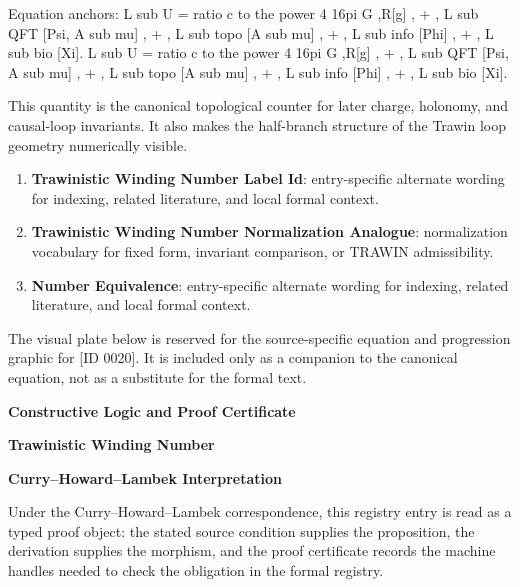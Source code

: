 Equation anchors: L sub U = ratio c to the power 4 16pi G ,R[g] , + , L sub QFT [Psi, A sub mu] , + , L sub topo [A sub mu] , + , L sub info [Phi] , + , L sub bio [Xi]. L sub U = ratio c to the power 4 16pi G ,R[g] , + , L sub QFT [Psi, A sub mu] , + , L sub topo [A sub mu] , + , L sub info [Phi] , + , L sub bio [Xi].

This quantity is the canonical topological counter for later charge, holonomy, and causal-loop invariants. It also makes the half-branch structure of the Trawin loop geometry numerically visible.
\endgroup

\begingroup\footnotesize\sloppy
\begin{enumerate}[leftmargin=1.35em,itemsep=1pt,topsep=1pt,parsep=0pt]
\item \textbf{Trawinistic Winding Number Label Id}: entry-specific alternate wording for indexing, related literature, and local formal context.
\item \textbf{Trawinistic Winding Number Normalization Analogue}: normalization vocabulary for fixed form, invariant comparison, or TRAWIN admissibility.
\item \textbf{Number Equivalence}: entry-specific alternate wording for indexing, related literature, and local formal context.
\end{enumerate}
\endgroup

\begingroup\footnotesize\sloppy
The visual plate below is reserved for the source-specific equation and progression graphic for [ID 0020]. It is included only as a companion to the canonical equation, not as a substitute for the formal text.
\par\endgroup
\ifTZPDarkEdition
{}
\fi

\clearpage
\begingroup\tzpsupportsetup
\noindent\textbf{\fontsize{10.8pt}{12.8pt}\selectfont [ID 0020] Constructive Logic and Proof Certificate}\par
\noindent\textbf{\fontsize{10pt}{12pt}\selectfont Trawinistic Winding Number}\par
\vspace{0.45em}
\begingroup
\footnotesize
\setlength{\parskip}{0.22em}
\setlength{\parindent}{0pt}
\noindent\textbf{Curry--Howard--Lambek Interpretation}\par
Under the Curry--Howard--Lambek correspondence, this registry entry is read as a typed proof
object: the stated source condition supplies the proposition, the derivation supplies the
morphism, and the proof certificate records the machine handles needed to check the obligation
in the formal registry.

